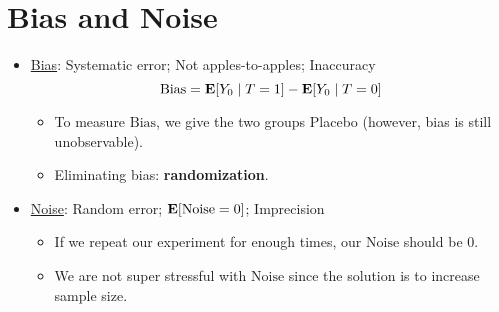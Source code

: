 \documentclass[10pt, letterpaper]{article}
\def\E{\vb E}
\def\Bias{\mathrm{Bias}}
\begin{document}
\section{Bias and Noise}
\begin{itemize}
	\item \underline{Bias}: Systematic error; Not apples-to-apples; Inaccuracy \[\Bias=\E[Y_0\mid T=1]-\E[Y_0\mid T=0]\]
	\begin{itemize}
		\item To measure $\Bias$, we give the two groups Placebo (however, bias is still unobservable). 
		\item Eliminating bias: \textbf{randomization}.
	\end{itemize}
	\item \underline{Noise}: Random error; $\E\qty[\mathrm{Noise}=0]$; Imprecision
	\begin{itemize}
		\item If we repeat our experiment for enough times, our $\mathrm{Noise}$ should be $0$.
		\item We are not super stressful with $\mathrm{Noise}$ since the solution is to increase sample size. 
	\end{itemize}
\end{itemize}
\end{document}
